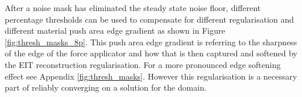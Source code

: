 After a noise mask has eliminated the steady state noise floor, different percentage thresholds can be used to compensate for different regularisation and different material push area edge gradient as shown in Figure \ref{fig:thresh_masks_8p}. This push area edge gradient is referring to the sharpness of the edge of the force applicator and how that is then captured and softened by the EIT reconstruction regularisation. For a more pronounced edge softening effect see Appendix \ref{fig:thresh_masks}. However this regularisation is a necessary part of reliably converging on a solution for the domain.
